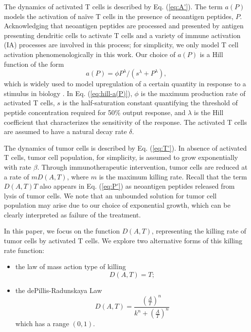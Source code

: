 \documentclass[review,authoryear]{elsarticle}
\begin{document}
The dynamics of activated T cells is described by Eq. (\ref{eq:A'}). The term $a(P)$ models the activation of na\"ive T cells in the presence of neoantigen peptides, $P$. Acknowledging that neoantigen peptides are processed and presented by antigen presenting dendritic cells to activate T cells and a variety of immune activation (IA) processes are involved in this process; for simplicity, we only model T cell activation phenomenologically in this work. Our choice of $a(P)$ is a Hill function of the form   
\begin{equation} \label{eq:hill-a(P)}
a(P)=\phi P^{\lambda}/(s^{\lambda}+P^{\lambda}), 
\end{equation}
which is widely used to model upregulation of a certain quantity in response to a stimulus in biology \citep{Somvanshi2013}. In Eq. (\ref{eq:hill-a(P)}), $\phi$ is the maximum production rate of activated T cells, $s$ is the half-saturation constant quantifying the threshold of peptide concentration required for 50\% output response, and $\lambda$ is the Hill coefficient that characterizes the sensitivity of the response. The activated T cells are assumed to have a natural decay rate $\delta$.

The dynamics of tumor cells is described by Eq. (\ref{eq:T'}). In absence of activated T cells, tumor cell population, for simplicity, is assumed to grow exponentially with rate $\beta$. Through immunotherapeutic intervention, tumor cells are reduced at a rate of $mD(A,T)$, where $m$ is the maximum killing rate. Recall that the term $D(A,T)T$ also appears in Eq. (\ref{eq:P'}) as neoantigen peptides released from lysis of tumor cells. We note that an unbounded solution for tumor cell population may arise due to our choice of exponential growth, which can be clearly interpreted as failure of the treatment. 

In this paper, we focus on the function $D(A,T)$, representing the killing rate of tumor cells by activated T cells. We explore two alternative forms of this killing rate function:
\begin{itemize}
\item the law of mass action type of killing
\begin{equation} 
   D(A,T)=T; \label{eq:mass-action-killing} 
\end{equation}
\item the dePillis-Radunskaya Law 
\begin{equation}
D(A,T)=\frac{(\frac{A}{T})^{n}}{k^{n}+(\frac{A}{T})^{n}} \label{eq:PR law-1} 
\end{equation}
which has a range $(0,1)$. 
\end{itemize}
\end{document}
